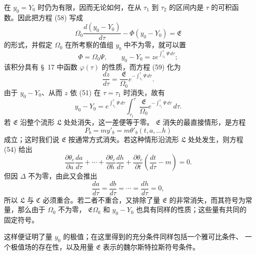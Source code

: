 \documentclass[11pt,a4paper,leqno]{article}
\begin{document}
在 $y_0=Y_0$ 时仍为有限，因而无论如何，在从 $\tau_1$ 到 $\tau_2$
的区间内是 $\tau$ 的可积函数。因此把方程 (58) 写成
\begin{equation}\tag{59}
\Omega_0\frac{d(y_0-Y_0)}{d\tau}-\Phi(y_0-Y_0)=\mathfrak{E}
\end{equation}
的形式，并假定 $\Omega_0$ 在所考察的值组 $y_b$ 中不为零，就可以置
\[
\Phi=\Omega_0\Psi,\qquad
y_0-Y_0=z e^{\int_{\tau_1}^{\tau}\Psi\,d\tau};
\]
该积分具有 \S~17 中函数 $\varphi(\tau)$ 的性质，而方程 (59) 化为
\[
\frac{dz}{d\tau}=\frac{\mathfrak{E}}{\Omega_0}
e^{-\int_{\tau_1}^{\tau}\Psi\,d\tau}.
\]
由于 $y_0-Y_0$、从而 $z$ 依 (51) 在 $\tau=\tau_1$ 时消失，故有
\[
y_0-Y_0=e^{\int_{\tau_1}^{\tau}\Psi\,d\tau}
\int_{\tau_1}^{\tau}\frac{\mathfrak{E}}{\Omega_0}
e^{-\int_{\tau_1}^{\tau}\Psi\,d\tau}\,d\tau.
\]
若 $\mathfrak{E}$ 沿整个流形 $\mathfrak{L}$ 处处消失，这一差便等于零。
$\mathfrak{E}$ 消失的最直接情形，是方程
\[
P_b=my'_b=m\theta'_b(t,a,\ldots h)
\]
成立；这时我们说 $\mathfrak{E}$ 按通常方式消失。若这种情形沿流形
$\mathfrak{L}$ 处处发生，则方程 (54) 给出
\[
\frac{\partial\theta_c}{\partial a}\frac{da}{d\tau}
+\cdots+
\frac{\partial\theta_c}{\partial h}\frac{dh}{d\tau}
+\frac{\partial\theta_c}{\partial t}
\left(\frac{dt}{d\tau}-m\right)=0.
\]
但因 $\Delta$ 不为零，由此又会推出
\[
\frac{da}{d\tau}=\frac{db}{d\tau}=\cdots=\frac{dh}{d\tau}=0,
\]
所以 $\mathfrak{L}$ 与 $\mathfrak{C}$ 必须重合。若二者不重合，又排除了量
$\mathfrak{E}$ 的非常消失，而其符号为常量，那么由于 $\Omega_0$ 不为零，
$\mathfrak{E}\Omega_0$ 和 $y_0-Y_0$ 也具有同样的性质；这些量有共同的固定符号。

这样便证明了量 $y_0$ 的极值；在这里得到的充分条件同样包括一个雅可比条件、
一个极值场的存在性，以及用量 $\mathfrak{E}$ 表示的魏尔斯特拉斯符号条件。
\end{document}
